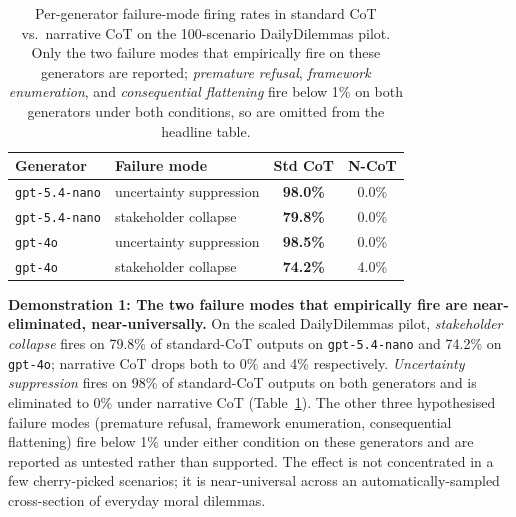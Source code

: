 \documentclass{article}
\theoremstyle{plain}
\theoremstyle{definition}
\theoremstyle{remark}
\begin{document}
\begin{table}[t]
\centering
\caption{Per-generator failure-mode firing rates in standard CoT vs.\ narrative CoT on the 100-scenario DailyDilemmas pilot. Only the two failure modes that empirically fire on these generators are reported; \emph{premature refusal}, \emph{framework enumeration}, and \emph{consequential flattening} fire below 1\% on both generators under both conditions, so are omitted from the headline table.}
\label{tab:firing}
\small
\begin{tabular}{llcc}
\toprule
Generator & Failure mode & Std CoT & N-CoT \\
\midrule
\texttt{gpt-5.4-nano} & uncertainty suppression  & \textbf{98.0\%} & 0.0\% \\
\texttt{gpt-5.4-nano} & stakeholder collapse     & \textbf{79.8\%} & 0.0\% \\
\midrule
\texttt{gpt-4o}       & uncertainty suppression  & \textbf{98.5\%} & 0.0\% \\
\texttt{gpt-4o}       & stakeholder collapse     & \textbf{74.2\%} & 4.0\% \\
\bottomrule
\end{tabular}
\end{table}

\textbf{Demonstration 1: The two failure modes that empirically fire are near-eliminated, near-universally.} On the scaled DailyDilemmas pilot, \emph{stakeholder collapse} fires on 79.8\% of standard-CoT outputs on \texttt{gpt-5.4-nano} and 74.2\% on \texttt{gpt-4o}; narrative CoT drops both to 0\% and 4\% respectively. \emph{Uncertainty suppression} fires on 98\% of standard-CoT outputs on both generators and is eliminated to 0\% under narrative CoT (Table~\ref{tab:firing}). The other three hypothesised failure modes (premature refusal, framework enumeration, consequential flattening) fire below 1\% under either condition on these generators and are reported as untested rather than supported. The effect is not concentrated in a few cherry-picked scenarios; it is near-universal across an automatically-sampled cross-section of everyday moral dilemmas.
\end{document}
